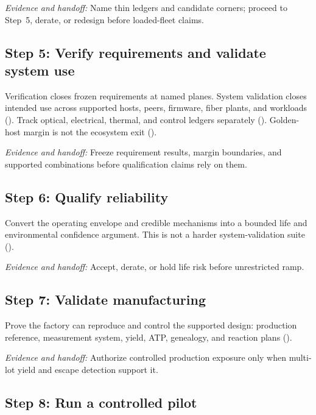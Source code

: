 \textit{Evidence and handoff:} Name thin ledgers and candidate corners; proceed
to Step~5, derate, or redesign before loaded-fleet claims.

\subsection{Step 5: Verify requirements and validate system use}
\label{sec:ladder-margin}
\label{sec:ladder-margin-interop}
\label{sec:ladder-interop}

Verification closes frozen requirements at named planes. System validation
closes intended use across supported hosts, peers, firmware, fiber plants, and
workloads (). Track optical,
electrical, thermal, and control ledgers separately
(). Golden-host margin is not the
ecosystem exit ().

\textit{Evidence and handoff:} Freeze requirement results, margin boundaries,
and supported combinations before qualification claims rely on them.

\subsection{Step 6: Qualify reliability}
\label{sec:ladder-stress}

Convert the operating envelope and credible mechanisms into a bounded life and
environmental confidence argument. This is not a harder system-validation
suite ().

\textit{Evidence and handoff:} Accept, derate, or hold life risk before
unrestricted ramp.

\subsection{Step 7: Validate manufacturing}
\label{sec:ladder-production}

Prove the factory can reproduce and control the supported design: production
reference, measurement system, yield, ATP, genealogy, and reaction plans
().

\textit{Evidence and handoff:} Authorize controlled production exposure only
when multi-lot yield and escape detection support it.

\subsection{Step 8: Run a controlled pilot}
\label{sec:ladder-fleet}

